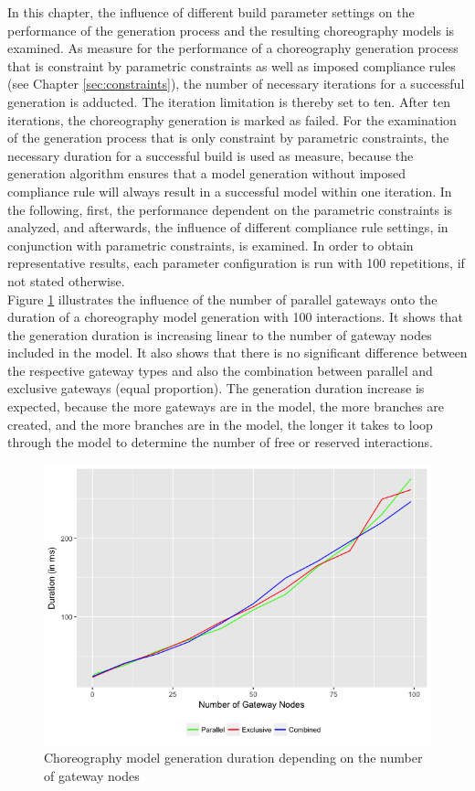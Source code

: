 In this chapter, the influence of different build parameter settings on the performance of the generation process and the resulting choreography models is examined. As measure for the performance of a choreography generation process that is constraint by parametric constraints as well as imposed compliance rules (see Chapter \ref{sec:constraints}), the number of necessary iterations for a successful generation is adducted. The iteration limitation is thereby set to ten. After ten iterations, the choreography generation is marked as failed. For the examination of the generation process that is only constraint by parametric constraints, the necessary duration for a successful build is used as measure, because the generation algorithm ensures that a model generation without imposed compliance rule will always result in a successful model within one iteration. In the following, first, the performance dependent on the parametric constraints is analyzed, and afterwards, the influence of different compliance rule settings, in conjunction with parametric constraints, is examined. In order to obtain representative results, each parameter configuration is run with 100 repetitions, if not stated otherwise.\\

Figure \ref{fig:anal_gateways} illustrates the influence of the number of parallel gateways onto the duration of a choreography model generation with 100 interactions. It shows that the generation duration is increasing linear to the number of gateway nodes included in the model. It also shows that there is no significant difference between the respective gateway types and also the combination between parallel and exclusive gateways (equal proportion). The generation duration increase is expected, because the more gateways are in the model, the more branches are created, and the more branches are in the model, the longer it takes to loop through the model to determine the number of free or reserved interactions.\\

\begin{figure}[htb]
\includegraphics[width=1\textwidth]{src/images/analysis_gateways.png}
\caption{Choreography model generation duration depending on the number of gateway nodes}
\label{fig:anal_gateways}
\end{figure}

